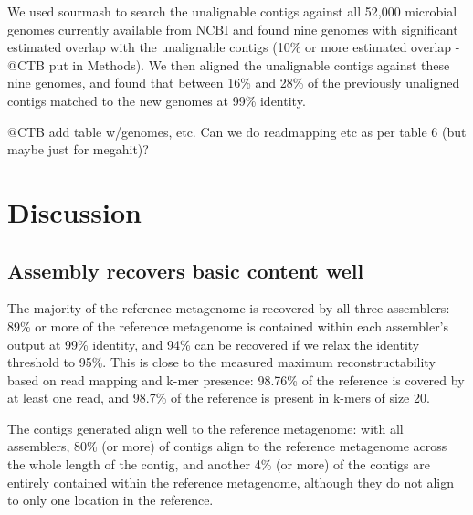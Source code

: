 \documentclass[10pt,a4paper,twocolumn]{article}
\begin{document}

We used sourmash \cite{sourmash} to search the unalignable contigs against all
52,000 microbial genomes currently available from NCBI and found nine
genomes with significant estimated overlap with the unalignable contigs
(10\% or more estimated overlap - @CTB put in Methods).  We then
aligned the unalignable contigs against these nine genomes, and found
that between 16\% and 28\% of the previously unaligned contigs matched
to the new genomes at 99\% identity.

@CTB add table w/genomes, etc. Can we do readmapping etc as per table 6
(but maybe just for megahit)?


\section*{Discussion}
\subsection*{Assembly recovers basic content well}

The majority of the reference metagenome is recovered by all three
assemblers: 89\% or more of the reference metagenome is contained
within each assembler’s output at 99\% identity, and 94\% can be
recovered if we relax the identity threshold to 95\%.  This is close
to the measured maximum reconstructability based on read mapping and
k-mer presence: 98.76\% of the reference is covered by at least one
read, and 98.7\% of the reference is present in k-mers of size 20.

The contigs generated align well to the reference metagenome: with all assemblers, 80\% (or
more) of contigs align to the reference metagenome across the whole
length of the contig, and another 4\% (or more) of the contigs are
entirely contained within the reference metagenome, although they do
not align to only one location in the reference.
\end{document}
